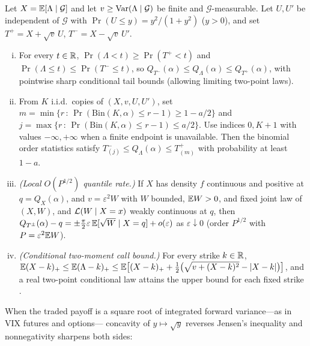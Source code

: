 \begin{proposition}\label{prop:condvar}
Let $X=\mathbb{E}[\Lambda\mid\mathcal{G}]$ and let $v\ge\operatorname{Var}(\Lambda\mid\mathcal{G})$ be finite and $\mathcal{G}$-measurable.
Let $U,U'$ be independent of $\mathcal{G}$ with $\Pr(U\le y)=y^2/(1+y^2)$ ($y>0$), and set
$T^+=X+\sqrt{v}\,U$, $T^-=X-\sqrt{v}\,U'$.
\begin{enumerate}[(i)]
\item For every $t\in\mathbb{R}$, $\Pr(\Lambda<t)\ge\Pr(T^+<t)$ and $\Pr(\Lambda\le t)\le\Pr(T^-\le t)$, so
  $Q_{T^-}(\alpha)\le Q_\Lambda(\alpha)\le Q_{T^+}(\alpha)$, with pointwise sharp conditional tail bounds (allowing limiting two-point laws).
\item From $K$ i.i.d.\ copies of $(X,v,U,U')$, set
  $m=\min\{r\,:\,\Pr(\mathrm{Bin}(K,\alpha)\le r-1)\ge1-a/2\}$ and
  $j=\max\{r\,:\,\Pr(\mathrm{Bin}(K,\alpha)\le r-1)\le a/2\}$. Use indices $0,K+1$ with values $-\infty,+\infty$ when a finite endpoint is unavailable.
  Then the binomial order statistics satisfy
  $T^-_{(j)}\le Q_\Lambda(\alpha)\le T^+_{(m)}$ with probability at least $1-a$.
\item \emph{(Local $O(P^{1/2})$ quantile rate.)} If $X$ has density $f$ continuous and positive at
  $q=Q_X(\alpha)$, and $v=\varepsilon^2 W$ with $W$ bounded, $\mathbb{E} W>0$, and fixed joint law of $(X,W)$, and $\mathcal{L}(W\mid X=x)$ weakly
  continuous at $q$, then $Q_{T^\pm}(\alpha)-q=\pm\tfrac{\pi}{2}\varepsilon\,\mathbb{E}[\sqrt{W}\mid X=q]+o(\varepsilon)$
  as $\varepsilon\downarrow0$ (order $P^{1/2}$ with $P=\varepsilon^2\mathbb{E} W$).
\item \emph{(Conditional two-moment call bound.)} For every strike $k\in\mathbb{R}$,
  $\mathbb{E}(X-k)_+\le\mathbb{E}(\Lambda-k)_+\le\mathbb{E}\big[(X-k)_++\tfrac12\big(\sqrt{v+(X-k)^2}-|X-k|\big)\big]$,
  and a real two-point conditional law attains the upper bound for each fixed strike \citep{Scarf1957,Lo1987}.
\end{enumerate}
\end{proposition}

When the traded payoff is a square root of integrated forward variance---as in VIX futures and options---
concavity of $y\mapsto\sqrt{y}$ reverses Jensen's inequality and nonnegativity sharpens both sides:

